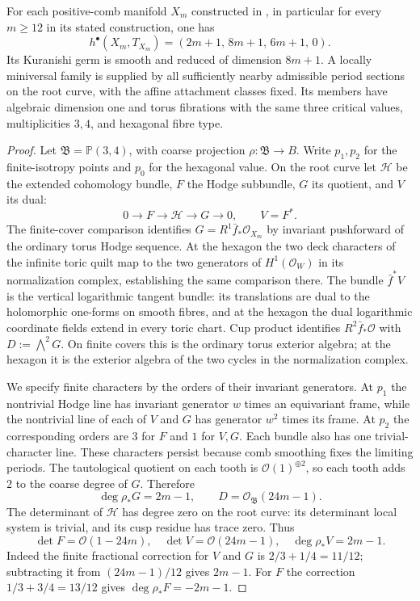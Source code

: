 
\begin{proposition}\label{cdp:st:E15}
For each positive-comb manifold $X_m$ constructed in
\cite{Viaclovsky2026Combs}, in particular for every $m\geq12$ in
its stated construction, one has
\[
 h^\bullet(X_m,T_{X_m})=(2m+1,\,8m+1,\,6m+1,\,0).
\]
Its Kuranishi germ is smooth and reduced of dimension $8m+1$.
A locally miniversal family is supplied by all sufficiently nearby
admissible period sections on the root curve, with the affine
attachment classes fixed. Its members have algebraic dimension one
and torus fibrations with the same three critical values,
multiplicities $3,4$, and hexagonal fibre type.
\end{proposition}
\begin{proof}
Let $\mathfrak B=\mathbb P(3,4)$, with coarse projection
$\rho:\mathfrak B\to B$. Write $p_1,p_2$ for the finite-isotropy
points and $p_0$ for the hexagonal value. On the root curve let
$\mathcal H$ be the extended cohomology bundle, $F$ the Hodge
subbundle, $G$ its quotient, and $V$ its dual:
\[
 0\longrightarrow F\longrightarrow\mathcal H
 \longrightarrow G\longrightarrow0,\qquad V=F^*.
\]
The finite-cover comparison identifies
$G=R^1\bar f_*\mathcal O_{X_m}$ by invariant pushforward of the
ordinary torus Hodge sequence. At the hexagon the two deck
characters of the infinite toric quilt map to the two generators
of $H^1(\mathcal O_W)$ in its normalization complex, establishing
the same comparison there. The bundle $\bar f^*V$ is the vertical
logarithmic tangent bundle: its translations are dual to the
holomorphic one-forms on smooth fibres, and at the hexagon the
dual logarithmic coordinate fields extend in every toric chart.
Cup product identifies $R^2\bar f_*\mathcal O$ with
$D:=\bigwedge^2G$. On finite covers this is the ordinary torus
exterior algebra; at the hexagon it is the exterior algebra of
the two cycles in the normalization complex.

We specify finite characters by the orders of their invariant
generators. At $p_1$ the nontrivial Hodge line has invariant
generator $w$ times an equivariant frame, while the nontrivial
line of each of $V$ and $G$ has generator $w^2$ times its frame.
At $p_2$ the corresponding orders are $3$ for $F$ and $1$ for
$V,G$. Each bundle also has one trivial-character line. These
characters persist because comb smoothing fixes the limiting
periods. The tautological quotient on each tooth is
$\mathcal O(1)^{\oplus2}$, so each tooth adds $2$ to the coarse
degree of $G$. Therefore
\[
 \deg\rho_*G=2m-1,\qquad D=\mathcal O_{\mathfrak B}(24m-1).
\]
The determinant of $\mathcal H$ has degree zero on the root
curve: its determinant local system is trivial, and its cusp
residue has trace zero. Thus
\[
 \det F=\mathcal O(1-24m),\quad
 \det V=\mathcal O(24m-1),\quad
 \deg\rho_*V=2m-1.
\]
Indeed the finite fractional correction for $V$ and $G$ is
$2/3+1/4=11/12$; subtracting it from $(24m-1)/12$ gives
$2m-1$. For $F$ the correction $1/3+3/4=13/12$ gives
$\deg\rho_*F=-2m-1$.


\end{proof}
